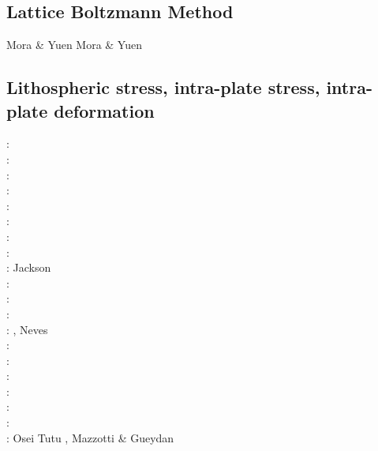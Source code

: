 \subsection{Lattice Boltzmann Method}

Mora \& Yuen \cite{moyu17}
Mora \& Yuen \cite{moyu18}


\subsection{Lithospheric stress, intra-plate stress, intra-plate deformation}

\begin{scriptsize}
\nineteenseventyfive: \cite{fouy75}\cite{sosr75}\\
\nineteenseventysix: \cite{riss76}\\
\nineteenseventyseven: \cite{chtu77}\\
\nineteenseventynine: \cite{riss79}\\
\nineteeneightynine: \cite{boww89}\\
\nineteenninetyone: \cite{worg91}\\
\nineteenninetytwo: \cite{rich92}\cite{wuvr92}\cite{zoba92}\cite{clko92}\\
\twothousandone: \cite{stsm01}\\
\twothousandtwo: Jackson \cite{jack02}\\
\twothousandfour: \cite{ligu04}\\
\twothousandfive: \cite{timr05}\\
\twothousandseven: \cite{hert07}\\
\twothousandeight: \cite{bilr08}\cite{ghhw08}, Neves \etal \cite{netv08}\\
\twothousandnine: \cite{ghhf09}\cite{nacl09}\\
\twothousandten: \cite{bepo10}\cite{yosh10}\\
\twothousandtwelve: \cite{nalr12}\cite{ghho12}\cite{wagw12}\\
\twothousandthirteen: \cite{ghhw13}\cite{wagw13}\\
\twothousandfourteen: \cite{vagw14}\\
\twothousandseventeen: \cite{grrb17}\\
\twothousandeighteen: Osei Tutu \etal \cite{osss18}, Mazzotti \& Gueydan \cite{magu18}
\end{scriptsize}


